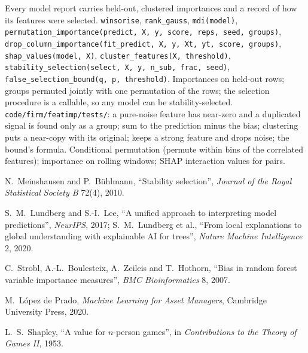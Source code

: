 \begin{build}
 Every model report carries held-out, clustered importances and a record of how its features were
selected.
 \texttt{winsorise}, \texttt{rank\_gauss}, \texttt{mdi(model)},
\texttt{permutation\_importance(predict, X, y, score, reps, seed, groups)}, \texttt{drop\_column\_importance(fit\_predict,
X, y, Xt, yt, score, groups)}, \texttt{shap\_values(model, X)}, \texttt{cluster\_features(X, threshold)},
\texttt{stability\_selection(select, X, y, n\_sub, frac, seed)}, \texttt{false\_selection\_bound(q, p, threshold)}.
 Importances on held-out rows; groups permuted jointly with one permutation of the rows; the selection
procedure is a callable, so any model can be stability-selected.
 \texttt{code/firm/featimp/tests/}: a pure-noise feature has near-zero 
and a duplicated signal is found only as a group;  sum to the prediction minus the bias; clustering puts a
near-copy with its original;  keeps a strong feature and drops noise; the bound's formula.
 Conditional permutation (permute within bins of the correlated features); importance on rolling
windows; SHAP interaction values for pairs.
\end{build}

\begin{omsources}
\item N.~Meinshausen and P.~Bühlmann, ``Stability selection'', \emph{Journal of the Royal Statistical Society B} 72(4),
2010.
\item S.~M.~Lundberg and S.-I.~Lee, ``A unified approach to interpreting model predictions'', \emph{NeurIPS}, 2017;
S.~M.~Lundberg et al., ``From local explanations to global understanding with explainable AI for trees'', \emph{Nature
Machine Intelligence} 2, 2020.
\item C.~Strobl, A.-L.~Boulesteix, A.~Zeileis and T.~Hothorn, ``Bias in random forest variable importance measures'',
\emph{BMC Bioinformatics} 8, 2007.
\item M.~López de Prado, \emph{Machine Learning for Asset Managers}, Cambridge University Press, 2020.
\item L.~S.~Shapley, ``A value for $n$-person games'', in \emph{Contributions to the Theory of Games II}, 1953.
\end{omsources}

